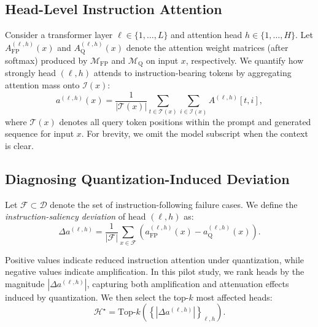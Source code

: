 \subsection{Head-Level Instruction Attention}
\label{sec:head_attention}

Consider a transformer layer $\ell \in \{1,\ldots,L\}$ and attention head
$h \in \{1,\ldots,H\}$.
Let $A^{(\ell,h)}_{\text{FP}}(x)$ and $A^{(\ell,h)}_{\text{Q}}(x)$ denote the
attention weight matrices (after softmax) produced by $\mathcal{M}_{\text{FP}}$
and $\mathcal{M}_{\text{Q}}$ on input $x$, respectively.
We quantify how strongly head $(\ell,h)$ attends to instruction-bearing tokens
by aggregating attention mass onto $\mathcal{I}(x)$:
\begin{equation}
a^{(\ell,h)}(x) =
\frac{1}{|\mathcal{T}(x)|}
\sum_{t \in \mathcal{T}(x)}
\sum_{i \in \mathcal{I}(x)}
A^{(\ell,h)}[t,i],
\label{eq:instruction_attention}
\end{equation}
where $\mathcal{T}(x)$ denotes all query token positions within the prompt and
generated sequence for input $x$.
For brevity, we omit the model subscript when the context is clear.

\subsection{Diagnosing Quantization-Induced Deviation}
\label{sec:diagnosis}

Let $\mathcal{F} \subset \mathcal{D}$ denote the set of instruction-following
failure cases.
We define the \emph{instruction-saliency deviation} of head $(\ell,h)$ as:
\begin{equation}
\Delta a^{(\ell,h)} =
\frac{1}{|\mathcal{F}|}
\sum_{x \in \mathcal{F}}
\left(
a^{(\ell,h)}_{\text{FP}}(x)
-
a^{(\ell,h)}_{\text{Q}}(x)
\right).
\label{eq:delta_attention}
\end{equation}

Positive values indicate reduced instruction attention under quantization, while negative values indicate amplification.
In this pilot study, we rank heads by the magnitude
$|\Delta a^{(\ell,h)}|$, capturing both amplification and attenuation effects
induced by quantization.
We then select the top-$k$ most affected heads:
\begin{equation}
\mathcal{H}^\star =
\text{Top-}k
\left(
\left\{
|\Delta a^{(\ell,h)}|
\right\}_{\ell,h}
\right).
\label{eq:critical_heads}
\end{equation}

